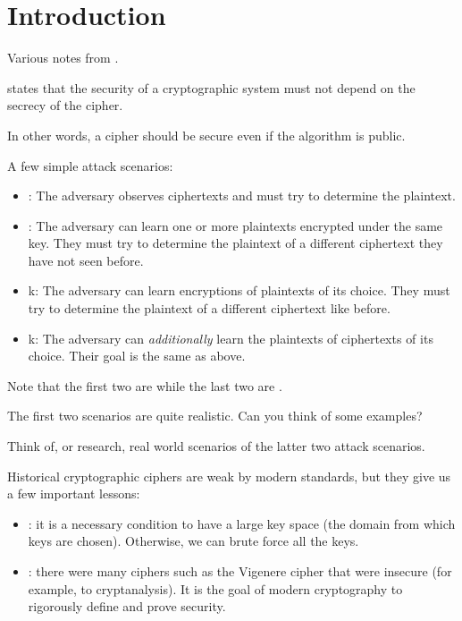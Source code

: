 \section{Introduction}
\label{introduction}

Various notes from \cite{katz-lindell}.

\begin{definition}
     states that the security of a cryptographic system  must not depend on the secrecy of the cipher.

    In other words, a cipher should be secure even if the algorithm is public.
\end{definition}

A few simple attack scenarios:
\begin{itemize}
    \item {}: The adversary observes ciphertexts and must try to determine the plaintext.
\item {}: The adversary can learn one or more plaintexts encrypted under the same key. They must try to determine the plaintext of a different ciphertext they have not seen before.
\item {}k: The adversary can learn encryptions of plaintexts of its choice. They must try to determine the plaintext of a different ciphertext like before.
\item {}k: The adversary can \textit{additionally} learn the plaintexts of ciphertexts of its choice. Their goal is the same as above.
\end{itemize}

Note that the first two are  while the last two are .

\begin{exercise}
    The first two scenarios are quite realistic. Can you think of some examples?
\end{exercise} 

\begin{exercise}
    Think of, or research, real world scenarios of the latter two attack scenarios.
\end{exercise}

Historical cryptographic ciphers are weak by modern standards, but they give us a few important lessons:
\begin{itemize}
    \item {}: it is a necessary condition to have a large key space (the domain from which keys are chosen). Otherwise, we can brute force all the keys.
    \item {}: there were many ciphers such as the Vigenere cipher that were insecure (for example, to cryptanalysis). It is the goal of modern cryptography to rigorously define and prove security.
\end{itemize}

